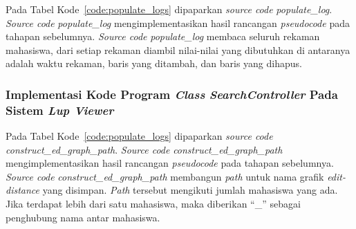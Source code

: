 Pada Tabel Kode~\ref{code:populate_logs} dipaparkan \emph{source code}
\emph{populate\_log}. \emph{Source code} \emph{populate\_log}
mengimplementasikan hasil rancangan \emph{pseudocode} pada tahapan
sebelumnya. \emph{Source code} \emph{populate\_log} membaca seluruh
rekaman mahasiswa, dari setiap rekaman diambil nilai-nilai yang
dibutuhkan di antaranya adalah waktu rekaman, baris yang ditambah, dan
baris yang dihapus.

\par\null\par
\begin{code}
    \label{code:populate_logs}
\end{code}

\subsubsection{Implementasi Kode Program \emph{Class} \emph{SearchController} Pada Sistem
  \emph{Lup Viewer}}

Pada Tabel Kode~\ref{code:populate_logs} dipaparkan \emph{source code}
\emph{construct\_ed\_graph\_path}. \emph{Source code}
\emph{construct\_ed\_graph\_path} mengimplementasikan hasil rancangan
\emph{pseudocode} pada tahapan sebelumnya. \emph{Source code}
\emph{construct\_ed\_graph\_path} membangun \emph{path} untuk nama
grafik \emph{edit-distance} yang disimpan. \emph{Path} tersebut
mengikuti jumlah mahasiswa yang ada. Jika terdapat lebih dari satu
mahasiswa, maka diberikan ``\_'' sebagai penghubung nama antar
mahasiswa.

